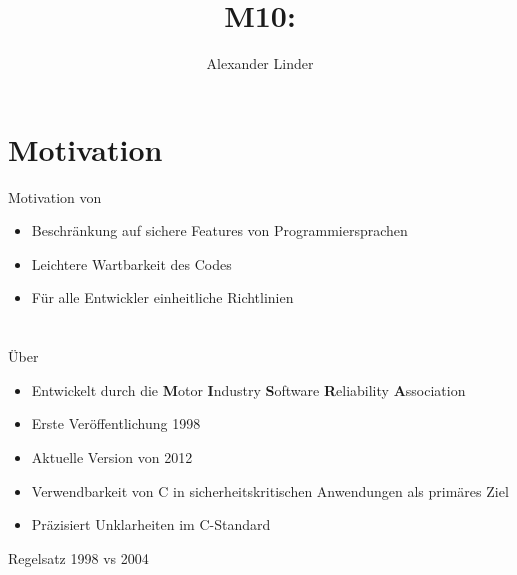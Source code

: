 \documentclass{beamer}
\title{M10: \sqss}
\author[Linder]{Alexander Linder}
\date{} %
\institute{FAKULTÄT FÜR INFORMATIK}
\begin{document}

    \begin{frame}
        \maketitle
    \end{frame}

    \begin{frame}
        \tableofcontents
    \end{frame}

    \section{Motivation}
    \label{sec:motivation}
    \begin{frame}{Motivation von \sqss}
        \begin{itemize}
            \item Beschränkung auf sichere Features von Programmiersprachen
            \item Leichtere Wartbarkeit des Codes
            \item Für alle Entwickler einheitliche Richtlinien
        \end{itemize}
    \end{frame}

    \section{\misra}
    \label{sec:misra-c}
    \begin{frame}{Über \misra}
        \begin{itemize}
            \item Entwickelt durch die \textbf{M}otor \textbf{I}ndustry \textbf{S}oftware \textbf{R}eliability \textbf{A}ssociation
            \item Erste Veröffentlichung 1998
            \item Aktuelle Version von 2012
            \item Verwendbarkeit von C in sicherheitskritischen Anwendungen als primäres Ziel
            \item Präzisiert Unklarheiten im C-Standard
        \end{itemize}
    \end{frame}

    \begin{frame}{Regelsatz 1998 vs 2004}
        \begin{center}
            
        \end{center}
    \end{frame}
\end{document}

